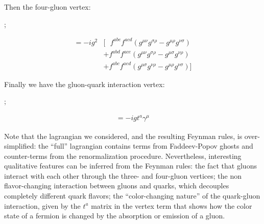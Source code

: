 Then the four-gluon vertex:
\begin{center}
    \begin{minipage}{0.4\textwidth}
        \hspace{2cm};
    \end{minipage}
    \begin{minipage}{0.58\textwidth}
        \begin{align}\nonumber = -ig^2&
        [~~~f^{abe}f^{acd}(g^{\mu\nu}g^{\sigma\rho} - g^{\mu\rho}g^{\nu\sigma}) \\\nonumber
        &+f^{abd}f^{ace}(g^{\mu\nu}g^{\sigma\rho} - g^{\mu\sigma}g^{\nu\rho}) \\\nonumber 
        &+f^{abc}f^{aed}(g^{\mu\sigma}g^{\nu\rho} - g^{\mu\rho}g^{\nu\sigma})]
        \end{align}
    \end{minipage}
\end{center}
Finally we have the gluon-quark interaction vertex:
\begin{center}
    \begin{minipage}{0.4\textwidth}
        \hspace{2cm};
    \end{minipage}
    \begin{minipage}{0.58\textwidth}
        \hspace{-1.5cm}\begin{align}\nonumber = -igt^a\gamma^\mu
        \end{align}
    \end{minipage}
\end{center}
Note that the lagrangian we considered, and the resulting Feynman rules, is over-simplified: the ``full'' lagrangian contains terms from Faddeev-Popov ghosts and counter-terms from the renormalization procedure. Nevertheless, interesting qualitative features can be inferred from the Feynman rules: the fact that gluons interact with each other through the three- and four-gluon vertices; the non flavor-changing interaction between gluons and quarks, which decouples completely different quark flavors; the ``color-changing nature'' of the quark-gluon interaction, given by the $t^a$ matrix in the vertex term that shows how the color state of a fermion is changed by the absorption or emission of a gluon.\\
 

